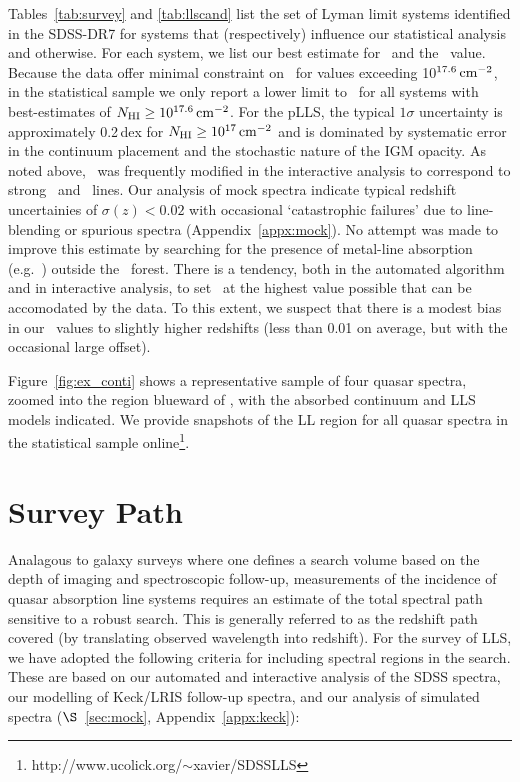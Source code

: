 \documentclass[12pt,preprint]{aastex}
\begin{document}
Tables~\ref{tab:survey} and \ref{tab:llscand} list the set of 
Lyman limit systems identified in the SDSS-DR7 for systems
that (respectively) influence our statistical analysis and otherwise. 
For each system, we list our best estimate for \zlls\ and the \nhi\ value.
Because the data offer minimal constraint on \nhi\
for values exceeding 10$^{17.6} \, {\rm cm^{-2}}$,
in the statistical sample we only report a lower
limit to \nhi\ for all systems with best-estimates of
$N_{\rm HI} \ge 10^{17.6} \, {\rm cm^{-2}}$. 
For the pLLS, the typical $1\sigma$ uncertainty
is approximately 0.2\,dex for $N_{\rm HI} \ge 10^{17} \, {\rm cm^{-2}}$
and is dominated by systematic error in
the continuum placement and the stochastic nature of the IGM opacity. 
As noted above,
\zlls\ was frequently modified
in the interactive analysis to correspond to strong \lya\ and
\lyb\ lines.
Our analysis of mock spectra indicate typical redshift
uncertainies of $\sigma(z) < 0.02$ with occasional
`catastrophic failures' due to line-blending or spurious
spectra (Appendix~\ref{appx:mock}).
No attempt was made to improve this
estimate by searching for the presence of metal-line
absorption (e.g.\ ) outside the \lya\ forest.
There is a tendency, both in the automated algorithm and in 
interactive analysis, to set \zlls\ at the highest value possible
that can be accomodated by the data.  To this extent, we suspect
that there is a modest bias in our \zlls\ values to slightly
higher redshifts (less than 0.01 on average, but with
the occasional large offset).

Figure~\ref{fig:ex_conti} shows a representative sample of four quasar
spectra, zoomed into the region blueward of \lyb, with the
absorbed continuum and LLS models indicated. 
We provide snapshots of the 
LL region for all quasar spectra in the statistical sample 
online\footnote{http://www.ucolick.org/$\sim$xavier/SDSSLLS}.


\section{Survey Path}
\label{sec:path}

Analagous to galaxy surveys where one defines a search
volume based on the depth of imaging and spectroscopic
follow-up, measurements of the incidence of quasar absorption line systems
requires an estimate of the total spectral path sensitive 
to a robust search.  This is generally referred to as the redshift
path covered (by translating observed wavelength into redshift).
For the survey of LLS, we have adopted the following criteria
for including spectral regions in the search.  These are based on our 
automated and interactive analysis of the SDSS spectra, 
our modelling of Keck/LRIS follow-up spectra, and our analysis
of simulated spectra ($\S$~\ref{sec:mock}, Appendix~\ref{appx:keck}):
\end{document}
